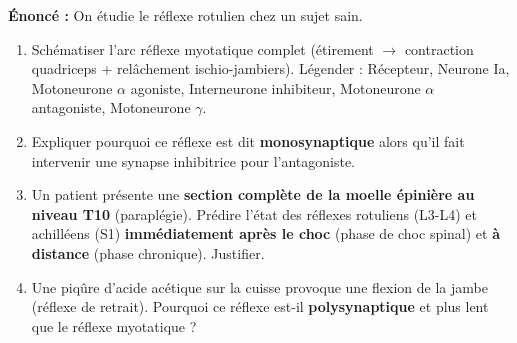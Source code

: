 \documentclass[11pt]{article}
\begin{document}
\begin{exoresolu}
\textbf{Énoncé :} On étudie le réflexe rotulien chez un sujet sain.
\begin{enumerate}
    \item Schématiser l'arc réflexe myotatique complet (étirement $\rightarrow$ contraction quadriceps + relâchement ischio-jambiers). Légender : Récepteur, Neurone Ia, Motoneurone $\alpha$ agoniste, Interneurone inhibiteur, Motoneurone $\alpha$ antagoniste, Motoneurone $\gamma$.
    \item Expliquer pourquoi ce réflexe est dit \textbf{monosynaptique} alors qu'il fait intervenir une synapse inhibitrice pour l'antagoniste.
    \item Un patient présente une \textbf{section complète de la moelle épinière au niveau T10} (paraplégie). Prédire l'état des réflexes rotuliens (L3-L4) et achilléens (S1) \textbf{immédiatement après le choc} (phase de choc spinal) et \textbf{à distance} (phase chronique). Justifier.
    \item Une piqûre d'acide acétique sur la cuisse provoque une flexion de la jambe (réflexe de retrait). Pourquoi ce réflexe est-il \textbf{polysynaptique} et plus lent que le réflexe myotatique ?
\end{enumerate}


\end{exoresolu}
\end{document}
